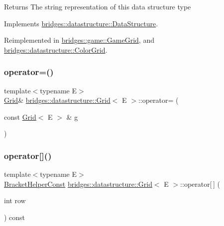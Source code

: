 \begin{DoxyReturn}{Returns}
The string representation of this data structure type 
\end{DoxyReturn}


Implements \hyperlink{classbridges_1_1datastructure_1_1_data_structure_a4ff66cb34409f11fe9fc647f6d8a22ce}{bridges\+::datastructure\+::\+Data\+Structure}.



Reimplemented in \hyperlink{classbridges_1_1game_1_1_game_grid_a07da19700a077e3d0f2cde2cade2ba60}{bridges\+::game\+::\+Game\+Grid}, and \hyperlink{classbridges_1_1datastructure_1_1_color_grid_afad945d648b427ca183a1dface8249b7}{bridges\+::datastructure\+::\+Color\+Grid}.

\mbox{\label{classbridges_1_1datastructure_1_1_grid_a3522d8c94ad390ebafb12257a6c9b82f}} 
\subsubsection{\texorpdfstring{operator=()}{operator=()}}
{\footnotesize\ttfamily template$<$typename E$>$ \\
\hyperlink{classbridges_1_1datastructure_1_1_grid}{Grid}\& \hyperlink{classbridges_1_1datastructure_1_1_grid}{bridges\+::datastructure\+::\+Grid}$<$ E $>$\+::operator= (\begin{DoxyParamCaption}\item[{const \hyperlink{classbridges_1_1datastructure_1_1_grid}{Grid}$<$ E $>$ \&}]{g }\end{DoxyParamCaption})\hspace{0.3cm}{\ttfamily [inline]}}

\mbox{\label{classbridges_1_1datastructure_1_1_grid_a754a890728b6b268a1ba843da89cb1f6}} 
\subsubsection{\texorpdfstring{operator[]()}{operator[]()}\hspace{0.1cm}{\footnotesize\ttfamily [1/2]}}
{\footnotesize\ttfamily template$<$typename E$>$ \\
\hyperlink{classbridges_1_1datastructure_1_1_grid_1_1_bracket_helper_const}{Bracket\+Helper\+Const} \hyperlink{classbridges_1_1datastructure_1_1_grid}{bridges\+::datastructure\+::\+Grid}$<$ E $>$\+::operator\mbox{[}$\,$\mbox{]} (\begin{DoxyParamCaption}\item[{int}]{row }\end{DoxyParamCaption}) const\hspace{0.3cm}{\ttfamily [inline]}}



